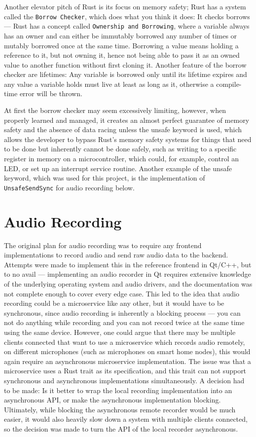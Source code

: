 Another elevator pitch of Rust is its focus on memory safety; Rust has a system called the \texttt{Borrow Checker}, which
does what you think it does: It checks borrows --- Rust has a concept called \texttt{Ownership and Borrowing},
where a variable always has an owner and can either be immutably borrowed any number of times or mutably borrowed once at the same time.
Borrowing a value means holding a reference to it, but not owning it, hence not being able to pass it as an owned value
to another function without first cloning it. Another feature of the borrow checker are lifetimes:
Any variable is borrowed only until its lifetime expires and any value a variable holds must live
at least as long as it, otherwise a compile-time error will be thrown.

At first the borrow checker may seem excessively limiting, however, when properly learned and managed,
it creates an almost perfect guarantee of memory safety and the absence of data racing unless the unsafe keyword is used,
which allows the developer to bypass Rust's memory safety systems for things that need to be done but inherently cannot be done safely,
such as writing to a specific register in memory on a microcontroller, which could, for example, control an LED, or set up an interrupt service routine.
Another example of the unsafe keyword, which was used for this project, is the implementation of \texttt{UnsafeSendSync} for audio recording below.

\section{Audio Recording}
The original plan for audio recording was to require any frontend implementations to record audio and send raw audio data to the backend.
Attempts were made to implement this in the reference frontend in Qt/C++, but to no avail --- implementing an audio recorder in Qt
requires extensive knowledge of the underlying operating system and audio drivers, and the documentation was not complete enough to cover every edge case.
This led to the idea that audio recording could be a microservice like any other, but it would have to be synchronous, since audio recording
is inherently a blocking process --- you can not do anything while recording and you can not record twice at the same time using the same device.
However, one could argue that there may be multiple clients connected that want to use a microservice which records audio remotely,
on different microphones (such as microphones on smart home nodes), this would again require an asynchronous microservice implementation.
The issue was that a microservice uses a Rust trait as its specification, and this trait can not support synchronous and asynchronous implementations simultaneously.
A decision had to be made: Is it better to wrap the local recording implementation into an asynchronous API, or make the asynchronous implementation blocking.
Ultimately, while blocking the asynchronous remote recorder would be much easier, it would also heavily slow down a system with multiple clients connected,
so the decision was made to turn the API of the local recorder asynchronous.

